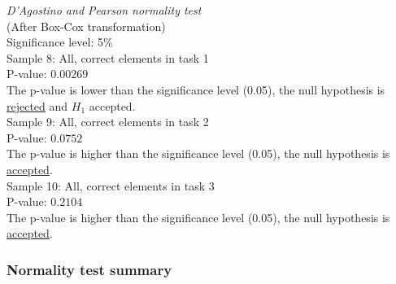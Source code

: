 \begin{center}
	\begin{tcolorbox}[box align=center,width=\textwidth-5cm]
		\centering
		\textit{D'Agostino and Pearson normality test}\\
		(After Box-Cox transformation) \\
		Significance level: 5\%  \\[0.5cm]
		
		Sample 8: All, correct elements in task 1 \\
		P-value: $0.00269$\\
		The p-value is lower than the significance level (0.05), the null hypothesis is \underline{rejected} and $H_1$ accepted.\\[0.5cm]
		
		Sample 9: All, correct elements in task 2 \\
		P-value: $0.0752$ \\
		The p-value is higher than the significance level (0.05), the null hypothesis is \underline{accepted}. \\[0.5cm]
		
		Sample 10: All, correct elements in task 3 \\
		P-value: $0.2104$ \\
		The p-value is higher than the significance level (0.05), the null hypothesis is \underline{accepted}. \\[0.5cm]
	\end{tcolorbox} 
\end{center}

\subsubsection{Normality test summary}\label{sec:normaltest_summary}

